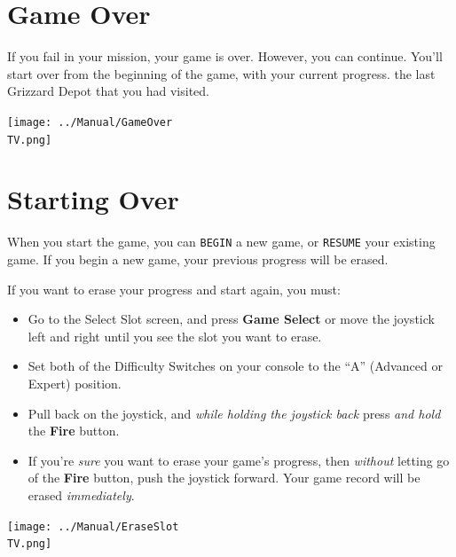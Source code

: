 \documentclass[10pt,twocolumn,openany,article]{memoir}
\newcommand\TV{NTSC} %
\begin{document}
\section{Game Over}

If  you fail  in  your mission,  your  game is  over.  However, you  can
continue. You'll start over from  \ifdefined\NOSAVE the beginning of the
game, with your current progress. \else the last Grizzard Depot that you
had visited. \fi

\begin{center}
  \texttt{[image: ../Manual/GameOver\\TV.png]}
\end{center}

\section{Starting Over}\label{Starting Your Adventure Over}

\ifdefined\NOSAVE

When  you  start  the  game,  you can  \texttt{BEGIN}  a  new  game,  or
\texttt{RESUME}  your existing  game.  If  you begin  a  new game,  your
previous progress will be erased.

\else

If you want to erase your progress and start again, you must:

\begin{itemize}
\item Go  to the Select Slot  screen, and press \textbf{Game  Select} or
  move  the joystick  left and  right until  you see  the slot  you want
  to erase.
\item Set both  of the Difficulty Switches on your  console to the ``A''
  (Advanced or Expert) position.
\item Pull  back on the  joystick, and \emph{while holding  the joystick
    back} press \emph{and hold} the \textbf{Fire} button.
\item If you're \emph{sure} you want to erase your game's progress, then
  \emph{without}  letting  go  of  the \textbf{Fire}  button,  push  the
  joystick  forward. \ifdefined\DEMO  Your  game record  will be  erased
  \emph{immediately}. \fi
\end{itemize}

\begin{center}
  \texttt{[image: ../Manual/EraseSlot\\TV.png]}
\end{center}
\end{document}
